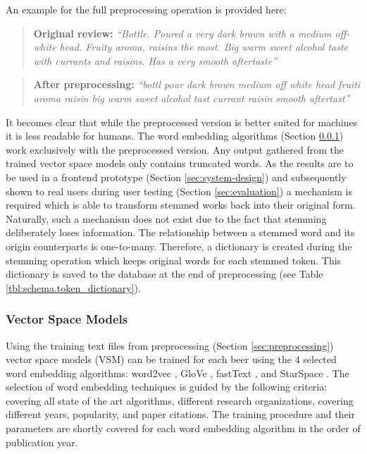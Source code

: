 An example for the full preprocessing operation is provided here:
\begin{quote}
    \textbf{Original review:}\newline
    \emph{``Bottle. Poured a very dark brown with a medium off-white head. Fruity aroma, raisins the most. Big warm sweet alcohol taste with currants and raisins. Has a very smooth aftertaste''}
\end{quote}

\begin{quote}
    \textbf{After preprocessing:}\newline
    \emph{``bottl pour dark brown medium off white head fruiti aroma raisin big warm sweet alcohol tast currant raisin smooth aftertast''}
\end{quote}
It becomes clear that while the preprocessed version is better suited for machines it is less readable for humans.
The word embedding algorithms (Section \ref{sec:vector-space-models}) work exclusively with the preprocessed version.
Any output gathered from the trained vector space models only contains truncated words.
As the results are to be used in a frontend prototype (Section \ref{sec:system-design}) and subsequently shown to real users during user testing (Section \ref{sec:evaluation}) a mechanism is required which is able to transform stemmed works back into their original form.
Naturally, such a mechanism does not exist due to the fact that stemming deliberately loses information.
The relationship between a stemmed word and its origin counterparts is one-to-many.
Therefore, a dictionary is created during the stemming operation which keeps original words for each stemmed token.
This dictionary is saved to the database at the end of preprocessing (see Table \ref{tbl:schema.token_dictionary}).


\subsubsection{Vector Space Models} \label{sec:vector-space-models}
Using the training text files from preprocessing (Section \ref{sec:preprocessing}) vector space models (VSM) can be trained for each beer using the 4 selected word embedding algorithms: word2vec \cite{Mikolov2013}, GloVe \cite{Pennington}, fastText \cite{Bojanowski2016}, and StarSpace \cite{Wu2017}.
The selection of word embedding techniques is guided by the following criteria: covering all state of the art algorithms, different research organizations, covering different years, popularity, and paper citations.
The training procedure and their parameters are shortly covered for each word embedding algorithm in the order of publication year.

